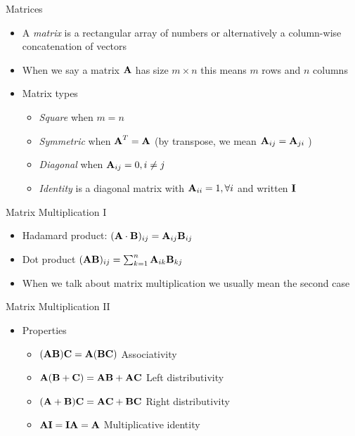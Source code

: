 \documentclass{beamer}
\begin{document}
\begin{frame}{Matrices} 
\begin{itemize}
 \item A \emph{matrix} is a rectangular array of numbers or alternatively a column-wise concatenation of vectors 
 \item When we say a matrix $\textbf{A}$ has size $m \times n$ this means $m$ rows and $n$ columns 
 \item Matrix types 
 \begin{itemize}
 \item \emph{Square} when $m = n$ 
 \item \emph{Symmetric} when $\textbf{A}^T = \textbf{A}$ (by transpose, we mean $\textbf{A}_{ij} = \textbf{A}_{ji}$ )
 \item \emph{Diagonal} when $\textbf{A}_{ij} = 0, i \neq j$ 
 \item \emph{Identity} is a diagonal matrix with $\textbf{A}_{ii} = 1, \forall i$ and written $\textbf{I}$ 
 \end{itemize}
\end{itemize}
\end{frame}

\begin{frame}{Matrix Multiplication I} 
\begin{itemize} 
 \item Hadamard product: $(\textbf{A} \cdot \textbf{B})_{ij} = \textbf{A}_{ij}\textbf{B}_{ij}$ 
 \item Dot product $(\textbf{A}\textbf{B})_{ij} = \sum_{k=1}^n \textbf{A}_{ik}\textbf{B}_{kj}$
 \item When we talk about matrix multiplication we usually mean the second case 
\end{itemize}
\end{frame}

\begin{frame}{Matrix Multiplication II}
\begin{itemize} 
  \item Properties 
 \begin{itemize}
 \item $(\textbf{A}\textbf{B})\textbf{C} = \textbf{A}(\textbf{B}\textbf{C})$ Associativity 
 \item $\textbf{A}(\textbf{B} + \textbf{C}) = \textbf{A}\textbf{B} + \textbf{A}\textbf{C}$ Left distributivity 
 \item $(\textbf{A} +\textbf{B}) \textbf{C} = \textbf{A}\textbf{C} +\textbf{B}\textbf{C}$ Right distributivity 
 \item $\textbf{A}\textbf{I} = \textbf{I}\textbf{A} = \textbf{A}$ Multiplicative identity 
 \end{itemize} 
 \end{itemize}
\end{frame}
\end{document}
